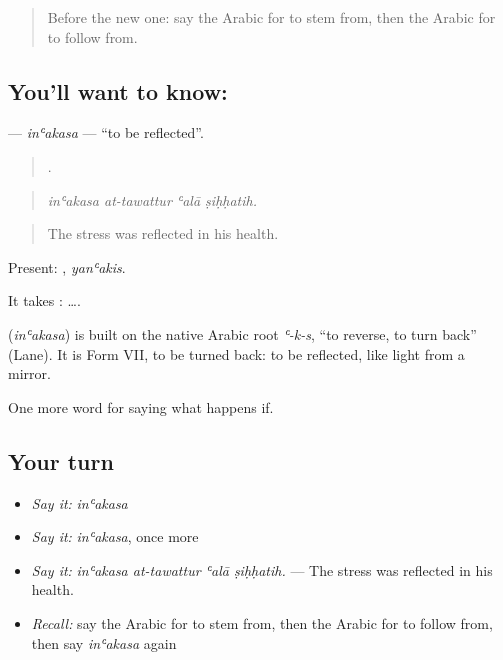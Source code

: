 \label{lesson:AR-C414-inakasa}



\begin{quote}
Before the new one: say the Arabic for to stem from, then the Arabic for to follow from.
\end{quote}

\subsection*{You'll want to know: }
\textbf{} — \emph{inʿakasa} — \textquotedblleft{}to be reflected\textquotedblright{}.

\begin{quote}
   .
\end{quote}

\begin{quote}
\emph{inʿakasa at-tawattur ʿalā ṣiḥḥatih.}
\end{quote}

\begin{quote}
The stress was reflected in his health.
\end{quote}

Present: , \emph{yanʿakis}.

It takes :   ….

\begin{cousinweb}
\textbf{} (\emph{inʿakasa}) is built on the native Arabic root \emph{ʿ-k-s}, \textquotedblleft{}to reverse, to turn back\textquotedblright{} (Lane). It is Form VII, to be turned back: to be reflected, like light from a mirror.
\end{cousinweb}

\begin{grammarlens}[title={What you've built}]
One more word for saying what happens if.
\end{grammarlens}

\subsection*{Your turn}
\begin{itemize}
\raggedright
  \item \emph{Say it:} \emph{inʿakasa}
  \item \emph{Say it:} \emph{inʿakasa}, once more
  \item \emph{Say it:} \emph{inʿakasa at-tawattur ʿalā ṣiḥḥatih.} — The stress was reflected in his health.
  \item \emph{Recall:} say the Arabic for to stem from, then the Arabic for to follow from, then say \emph{inʿakasa} again
\end{itemize}

